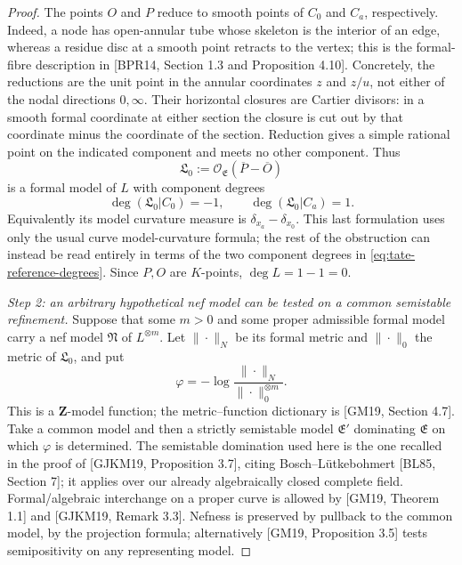 \begin{proof}
The points \(O\) and \(P\) reduce to smooth points of \(C_0\) and
\(C_a\), respectively. Indeed, a node has open-annular tube whose
skeleton is the interior of an edge, whereas a residue disc at a smooth
point retracts to the vertex; this is the formal-fibre description in
[BPR14, Section 1.3 and Proposition 4.10]. Concretely, the reductions
are the unit point in the annular coordinates \(z\) and \(z/u\), not
either of the nodal directions \(0,\infty\).
Their horizontal closures are Cartier divisors: in a smooth formal
coordinate at either section the closure is cut out by that coordinate
minus the coordinate of the section. Reduction gives a simple
rational point on the indicated component and meets no other component.
Thus
\[
 \mathfrak L_0
   :=\mathcal O_{\mathfrak E}(\overline P-\overline O)
\]
is a formal model of \(L\) with component degrees
\begin{equation}
\label{eq:tate-reference-degrees}
 \deg(\mathfrak L_0|C_0)=-1,
 \qquad \deg(\mathfrak L_0|C_a)=1.
\end{equation}
Equivalently its model curvature measure is
\(\delta_{x_a}-\delta_{x_0}\).
This last formulation uses only the usual curve model-curvature
formula; the rest of the obstruction can instead be read entirely in
terms of the two component degrees in
\eqref{eq:tate-reference-degrees}.
Since \(P,O\) are \(K\)-points, \(\deg L=1-1=0\).

\emph{Step 2: an arbitrary hypothetical nef model can be tested on a
common semistable refinement.}
Suppose that some \(m>0\) and some proper admissible formal model
carry a nef model \(\mathfrak N\) of \(L^{\otimes m}\).
Let \(\|\cdot\|_N\) be its formal metric and
\(\|\cdot\|_0\) the metric of \(\mathfrak L_0\), and put
\[
 \varphi=-\log\frac{\|\cdot\|_N}{\|\cdot\|_0^{\otimes m}}.
\]
This is a \(\mathbf Z\)-model function; the metric--function dictionary
is [GM19, Section 4.7]. Take a common model and then a strictly
semistable model \(\mathfrak E'\) dominating \(\mathfrak E\) on which
\(\varphi\) is determined. The semistable domination used here is the
one recalled in the proof of [GJKM19, Proposition 3.7], citing
Bosch--L\"utkebohmert [BL85, Section 7]; it applies over our already
algebraically closed complete field. Formal/algebraic interchange on a
proper curve is allowed by [GM19, Theorem 1.1] and [GJKM19, Remark 3.3].
Nefness is preserved by pullback to the common model, by the projection
formula; alternatively [GM19, Proposition 3.5] tests semipositivity on
any representing model.


\end{proof}
